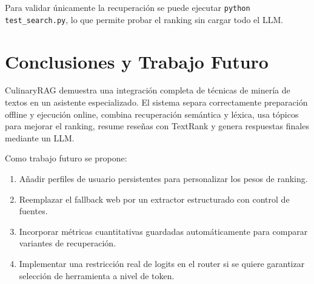 \documentclass[11pt,a4paper]{article}
\begin{document}
Para validar únicamente la recuperación se puede ejecutar \texttt{python test\_search.py}, lo que permite probar el ranking sin cargar todo el LLM.



\section{Conclusiones y Trabajo Futuro}

CulinaryRAG demuestra una integración completa de técnicas de minería de textos en un asistente especializado. El sistema separa correctamente preparación offline y ejecución online, combina recuperación semántica y léxica, usa tópicos para mejorar el ranking, resume reseñas con TextRank y genera respuestas finales mediante un LLM.

Como trabajo futuro se propone:
\begin{enumerate}
    \item Añadir perfiles de usuario persistentes para personalizar los pesos de ranking.
    \item Reemplazar el fallback web por un extractor estructurado con control de fuentes.
    \item Incorporar métricas cuantitativas guardadas automáticamente para comparar variantes de recuperación.
    \item Implementar una restricción real de logits en el router si se quiere garantizar selección de herramienta a nivel de token.
\end{enumerate}
\end{document}
